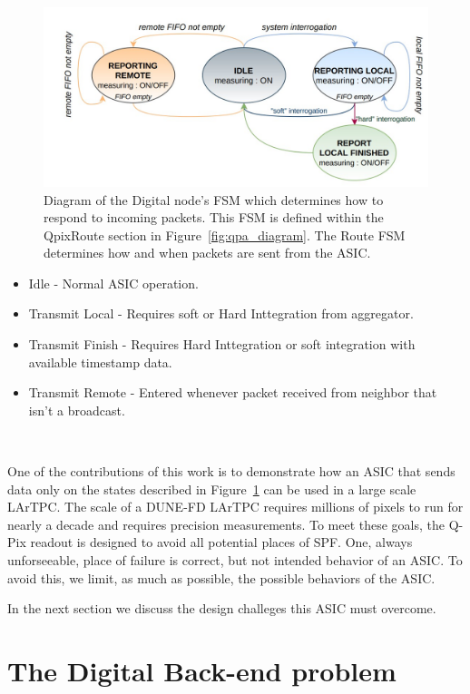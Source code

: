 \begin{figure}[]
\centering
\includegraphics[width=\textwidth]{images/digital_fsm_overview.jpg}
\caption{Diagram of the Digital node's FSM which determines how to respond to incoming packets.
This FSM is defined within the QpixRoute section in Figure~\ref{fig:qpa_diagram}.
The Route FSM determines how and when packets are sent from the ASIC.
}
\label{fig:digital_fsm}
\end{figure}

\begin{itemize}
    \item Idle - Normal ASIC operation.
    \item Transmit Local - Requires soft or Hard Inttegration from aggregator.
    \item Transmit Finish - Requires Hard Inttegration or soft integration with available timestamp data.
    \item Transmit Remote - Entered whenever packet received from neighbor that isn't a broadcast.
\end{itemize}~\label{fsm_state_labels}

One of the contributions of this work is to demonstrate how an ASIC that sends data only on the states described in Figure~\ref{fig:digital_fsm} can be used in a large scale LArTPC.
The scale of a DUNE-FD LArTPC requires millions of pixels to run for nearly a decade and requires precision measurements.
To meet these goals, the Q-Pix readout is designed to avoid all potential places of SPF.
One, always unforseeable, place of failure is correct, but not intended behavior of an ASIC.
To avoid this, we limit, as much as possible, the possible behaviors of the ASIC.

In the next section we discuss the design challeges this ASIC must overcome.

\section{The Digital Back-end problem}~\label{sec:digital_problem}

